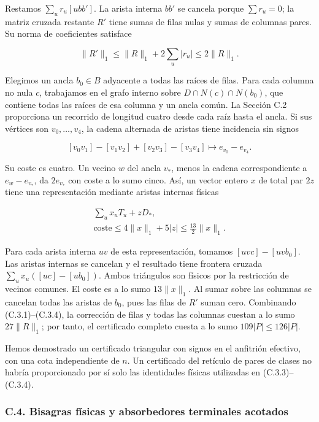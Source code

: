 \documentclass[spanish,11pt,a4paper]{article}
\begin{document}
Restamos \(\sum_u r_u[ubb']\). La arista interna \(bb'\) se cancela porque \(\sum r_u=0\); la matriz cruzada restante \(R'\) tiene sumas de filas nulas y sumas de columnas pares. Su norma de coeficientes satisface

\[\|R'\|_1\le\|R\|_1+2\sum_u|r_u|\le2\|R\|_1.
\tag{C.3.2}\]

Elegimos un ancla \(b_0\in B\) adyacente a todas las raíces de filas. Para cada columna no nula \(c\), trabajamos en el grafo interno sobre \(D\cap N(c)\cap N(b_0)\), que contiene todas las raíces de esa columna y un ancla común. La Sección C.2 proporciona un recorrido de longitud cuatro desde cada raíz hasta el ancla. Si sus vértices son \(v_0,\ldots,v_4\), la cadena alternada de aristas tiene incidencia sin signos

\[[v_0v_1]-[v_1v_2]+[v_2v_3]-[v_3v_4]
\longmapsto e_{v_0}-e_{v_4}.
\tag{C.3.3}\]

Su coste es cuatro. Un vecino \(w\) del ancla \(v_*\), menos la cadena correspondiente a \(e_w-e_{v_*}\), da \(2e_{v_*}\) con coste a lo sumo cinco. Así, un vector entero \(x\) de total par \(2z\) tiene una representación mediante aristas internas físicas

\[\begin{gathered}
\sum_u x_u T_u+zD_*,\\
\text{coste}\le4\|x\|_1+5|z|\le\tfrac{13}{2}\|x\|_1.
\end{gathered}
\tag{C.3.4}\]

Para cada arista interna \(uv\) de esta representación, tomamos \([uvc]-[uvb_0]\). Las aristas internas se cancelan y el resultado tiene frontera cruzada \(\sum_u x_u([uc]-[ub_0])\). Ambos triángulos son físicos por la restricción de vecinos comunes. El coste es a lo sumo \(13\|x\|_1\). Al sumar sobre las columnas se cancelan todas las aristas de \(b_0\), pues las filas de \(R'\) suman cero. Combinando (C.3.1)--(C.3.4), la corrección de filas y todas las columnas cuestan a lo sumo \(27\|R\|_1\); por tanto, el certificado completo cuesta a lo sumo \(109|P|\le126|P|\).

Hemos demostrado un certificado triangular con signos en el anfitrión efectivo, con una cota independiente de \(n\). Un certificado del retículo de pares de clases no habría proporcionado por sí solo las identidades físicas utilizadas en (C.3.3)--(C.3.4).

\subsubsection{C.4. Bisagras físicas y absorbedores terminales acotados}\label{c.4.-bisagras-fuxedsicas-y-absorbedores-terminales-acotados}
\end{document}
